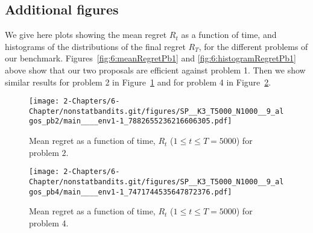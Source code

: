 \subsection{Additional figures}\label{app:6:moreFigures}

We give here plots showing the mean regret $R_t$ as a function of time, and histograms of the distributions of the final regret $R_T$, for the different problems of our benchmark.
%
Figures~\ref{fig:6:meanRegretPb1} and \ref{fig:6:histogramRegretPb1} above show that our two proposals are efficient against problem 1.
Then we show similar results for problem 2 in Figure~\ref{fig:6:meanRegretPb2}
and for problem 4 in Figure~\ref{fig:6:meanRegretPb4}.


\begin{figure}[h!]  %
    \centering
    \texttt{[image: 2-Chapters/6-Chapter/nonstatbandits.git/figures/SP\_\_K3\_T5000\_N1000\_\_9\_algos\_pb2/main\_\_\_\_env1-1\_7882655236216606305.pdf]}
    \caption{Mean regret as a function of time, $R_t$ ($1 \leq t \leq T = 5000$) for problem $2$.}
    \label{fig:6:meanRegretPb2}
\end{figure}

\begin{figure}[h!]  %
    \centering
    \texttt{[image: 2-Chapters/6-Chapter/nonstatbandits.git/figures/SP\_\_K3\_T5000\_N1000\_\_9\_algos\_pb4/main\_\_\_\_env1-1\_7471744535647872376.pdf]}
    \caption{Mean regret as a function of time, $R_t$ ($1 \leq t \leq T = 5000$) for problem 4.}
    \label{fig:6:meanRegretPb4}
\end{figure}


